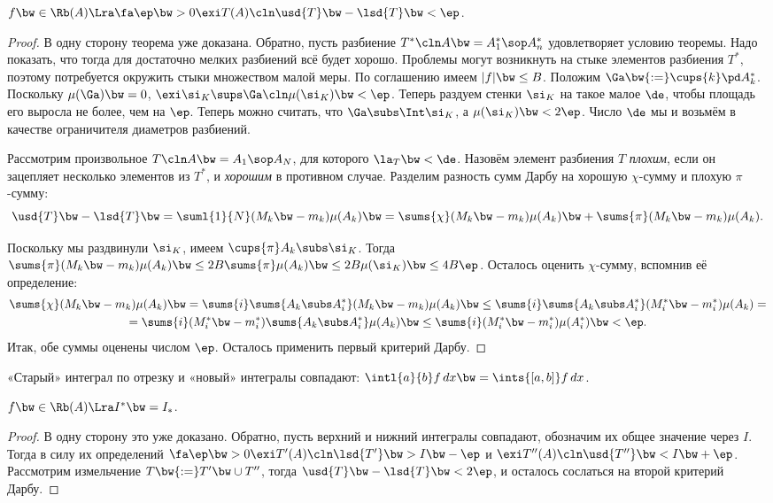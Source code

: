 \documentclass[a4paper]{article}
\begin{document}
\begin{theorem}
$f\bw\in \Rb(A) \Lra \fa \ep \bw> 0 \exi T(A)\cln \usd{T} \bw- \lsd{T} \bw< \ep$.
\end{theorem}
\begin{proof}
В одну сторону теорема уже доказана. Обратно, пусть разбиение $T^*\cln A \bw= A^*_1\sop A^*_n$
удовлетворяет условию теоремы. Надо показать, что тогда для достаточно мелких разбиений всё будет
хорошо. Проблемы могут возникнуть на стыке элементов разбиения $T^*$, поэтому потребуется окружить
стыки множеством малой меры. По соглашению имеем $|f| \bw\le B$. Положим $\Ga \bw{:=} \cups{k} \pd
A^*_k$. Поскольку $\mu(\Ga) \bw= 0$, $\exi \si_K \sups \Ga\cln \mu(\si_K) \bw< \ep$. Теперь раздуем
стенки $\si_K$ на такое малое $\de$, чтобы площадь его выросла не более, чем на $\ep$. Теперь можно
считать, что $\Ga \subs \Int \si_K$, а $\mu(\si_K) \bw<2\ep$. Число $\de$ мы и возьмём в качестве
ограничителя диаметров разбиений.

Рассмотрим произвольное $T\cln A \bw= A_1\sop A_N$, для которого $\la_T \bw< \de$. Назовём элемент
разбиения $T$ \emph{плохим}, если он зацепляет несколько элементов из $T^*$, и \emph{хорошим} в
противном случае. Разделим разность сумм Дарбу на хорошую $\chi$-сумму и плохую $\pi$-сумму:
$$\usd{T} \bw- \lsd{T} \bw= \suml{1}{N}(M_k \bw- m_k)\mu(A_k) \bw=
\sums{\chi} (M_k \bw- m_k)\mu(A_k) \bw+ \sums{\pi}(M_k \bw- m_k)\mu(A_k).$$

Поскольку мы раздвинули $\si_K$, имеем $\cups{\pi}A_k \subs \si_K$. Тогда
$\sums{\pi}(M_k\bw-m_k)\mu(A_k) \bw\le 2B\sums{\pi} \mu(A_k) \bw\le 2B \mu(\si_K) \bw\le 4B\ep$.
Осталось оценить $\chi$-сумму, вспомнив её определение:
\begin{multline*}
\sums{\chi}(M_k \bw- m_k)\mu(A_k) \bw= \sums{i}\sums{A_k \subs A_i^*} (M_k\bw-m_k)\mu(A_k) \bw\le
\sums{i}\sums{A_k \subs A_i^*} (M^*_i\bw-m^*_i)\mu(A_k) =\\=
\sums{i} (M^*_i \bw- m^*_i) \sums{A_k \subs A_i^*}\mu(A_k) \bw\le \sums{i} (M^*_i \bw- m^*_i) \mu(A^*_i) \bw< \ep.
\end{multline*}
Итак, обе суммы оценены числом $\ep$. Осталось применить первый критерий Дарбу.
\end{proof}

\begin{imp}
«Старый» интеграл по отрезку и «новый» интегралы совпадают: $\intl{a}{b}f\,d x \bw= \ints{[a,b]}f\,d x$.
\end{imp}

\begin{imp}
$f \bw\in \Rb(A) \Lra I^* \bw= I_*$.
\end{imp}
\begin{proof}
В одну сторону это уже доказано. Обратно, пусть верхний и нижний интегралы совпадают, обозначим их
общее значение через $I$. Тогда в силу их определений $\fa \ep \bw> 0 \exi T'(A)\cln \lsd{T'} \bw> I \bw-
\ep$ и $\exi T''(A)\cln \usd{T''} \bw< I \bw+ \ep$. Рассмотрим измельчение $T \bw{:=} T' \bw\cup T''$, тогда
$\usd{T} \bw- \lsd{T} \bw< 2\ep$, и осталось сослаться на второй критерий Дарбу.
\end{proof}
\end{document}
